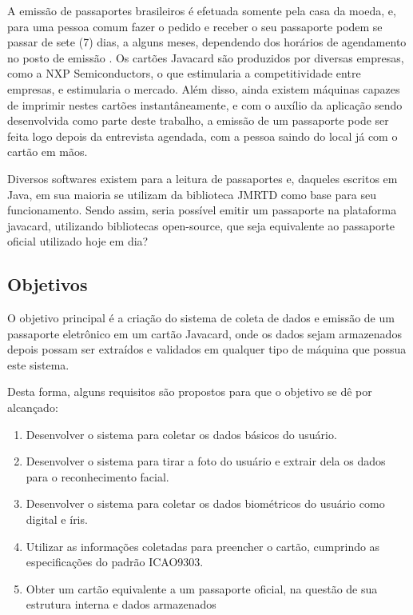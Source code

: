 \documentclass[11pt]{article}
\begin{document}
			A emissão de passaportes brasileiros é efetuada somente pela casa da moeda, e, para uma pessoa comum fazer o pedido e receber o seu passaporte podem se passar de sete (7) dias, a alguns meses, dependendo dos horários de agendamento no posto de emissão \parencite{PF2}. Os cartões Javacard são produzidos por diversas empresas, como a NXP Semiconductors, o que estimularia a competitividade entre empresas, e estimularia o mercado. Além disso, ainda existem máquinas capazes de imprimir nestes cartões instantâneamente, e com o auxílio da aplicação sendo desenvolvida como parte deste trabalho, a emissão de um passaporte pode ser feita logo depois da entrevista agendada, com a pessoa saindo do local já com o cartão em mãos.
			
			Diversos softwares existem para a leitura de passaportes e, daqueles escritos em Java, em sua maioria se utilizam da biblioteca JMRTD como base para seu funcionamento. Sendo assim, seria possível emitir um passaporte na plataforma javacard, utilizando bibliotecas open-source, que seja equivalente ao passaporte oficial utilizado hoje em dia?


	\subsection{Objetivos}
				
			O objetivo principal é a criação do sistema de coleta de dados e emissão de um passaporte eletrônico em um cartão Javacard, onde os dados sejam armazenados depois possam ser extraídos e validados em qualquer tipo de máquina que possua este sistema.
			
			 Desta forma, alguns requisitos são propostos para que o objetivo se dê por alcançado:
			\begin{enumerate}
			    \item Desenvolver o sistema para coletar os dados básicos do usuário.
				
				\item Desenvolver o sistema para tirar a foto do usuário e extrair dela os dados para o reconhecimento facial.
				
				\item Desenvolver o sistema para coletar os dados biométricos do usuário como digital e íris.
				
				\item Utilizar as informações coletadas para preencher o cartão, cumprindo as especificações do padrão ICAO9303.
				
				\item Obter um cartão equivalente a um passaporte oficial, na questão de sua estrutura interna e dados armazenados
				
			\end{enumerate}
		    
\end{document}
